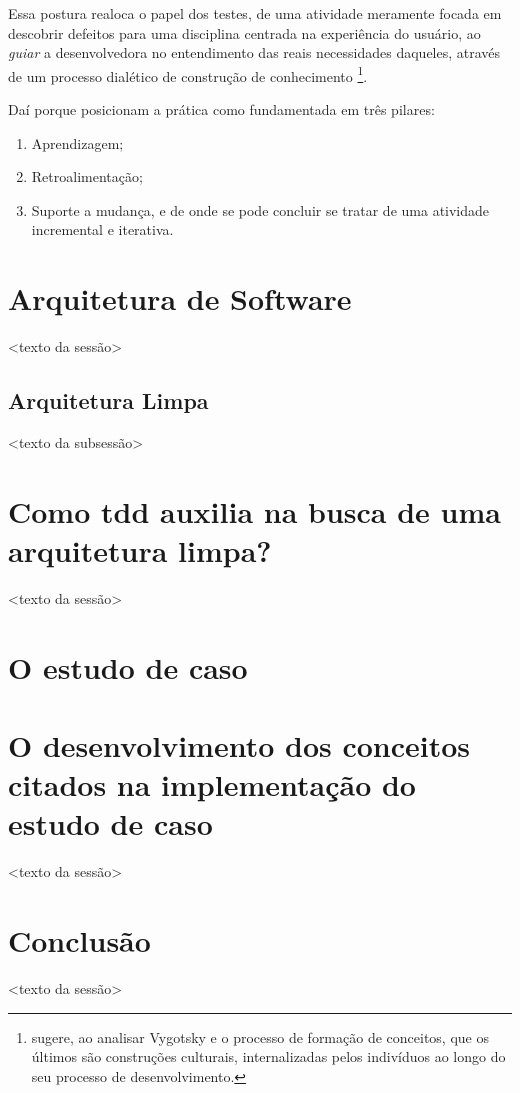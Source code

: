 \documentclass[12pt,a4paper,oneside,english,brazil]{article}
\begin{document}
      Essa postura realoca o papel dos testes, de uma atividade meramente focada
      em descobrir defeitos para uma disciplina centrada na experiência do
      usuário, ao  \emph{guiar} a desenvolvedora no entendimento das reais
      necessidades daqueles, através de um processo dialético de construção de
      conhecimento \footnote{ sugere, ao analisar
      Vygotsky e o processo de formação de conceitos, que os últimos são
      construções culturais, internalizadas pelos indivíduos ao longo do seu
      processo de desenvolvimento.}.

      Daí porque  posicionam a prática como
      fundamentada em três pilares:
      \begin{enumerate}
        \item Aprendizagem;
        \item Retroalimentação;
        \item Suporte a mudança, e de onde se pode concluir se tratar de uma
              atividade  incremental e iterativa.
      \end{enumerate}

      

  \section{Arquitetura de Software}

    <texto da sessão>

    \subsection{Arquitetura Limpa}

      <texto da subsessão>

  \section{Como tdd auxilia na busca de uma arquitetura limpa?}

    <texto da sessão>

  \section{O estudo de caso}

    

  \section{
    O desenvolvimento dos conceitos citados na implementação do estudo de caso
  }

    <texto da sessão>

  \section{Conclusão}

    <texto da sessão>

  \clearpage

  \renewcommand\refname{Referências Bibliográficas}

    
    
\end{document}
